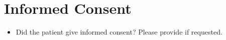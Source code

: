 \section{Informed Consent}
\begin{itemize}
    \item Did the patient give informed consent? Please provide if requested.


\end{itemize}
